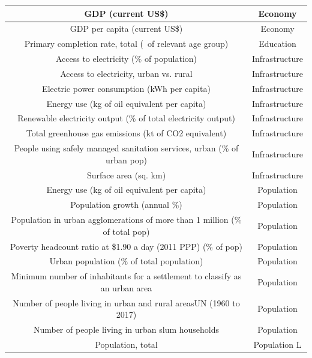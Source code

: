 \begin{longtable}{||c|c||}
        \hline
            GDP (current US\$) & Economy\\
        \hline
            GDP per capita (current US\$) & Economy \\
        \hline
            Primary completion rate, total (\ of relevant age group) & Education \\
        \hline
            Access to electricity (\% of population) & Infrastructure \\
        \hline
            Access to electricity, urban vs. rural & Infrastructure \\
        \hline
            Electric power consumption (kWh per capita) & Infrastructure \\
        \hline
            Energy use (kg of oil equivalent per capita) & Infrastructure \\
        \hline
            Renewable electricity output (\% of total electricity output) & Infrastructure \\
        \hline
            Total greenhouse gas emissions (kt of CO2 equivalent) & Infrastructure \\
        \hline
            People using safely managed sanitation services, urban (\% of urban pop) & Infrastructure \\
        \hline
            Surface area (sq. km) & Infrastructure \\
        \hline
            Energy use (kg of oil equivalent per capita) & Population\\
        \hline
            Population growth (annual \%) & Population\\
        \hline
            Population in urban agglomerations of more than 1 million (\% of total pop) & Population\\
        \hline
            Poverty headcount ratio at \$1.90 a day (2011 PPP) (\% of pop) & Population\\
        \hline
            Urban population (\% of total population) & Population\\
        \hline
            Minimum number of inhabitants for a settlement to classify as an urban area & Population \\
        \hline
            Number of people living in urban and rural areasUN (1960 to 2017) & Population \\
        \hline
            Number of people living in urban slum households & Population  \\
        \hline
            Population, total & Population L\\

\end{longtable}
